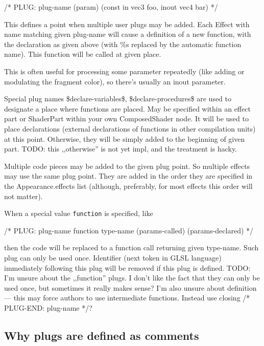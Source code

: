 \documentclass{acmsiggraph}                     %
\newenvironment{mycode}
{\begin{mycodecore}}
{\end{mycodecore}
\vspace{-0.1in}}
\begin{document}
\begin{mycode}
/* PLUG: plug-name (param) (const in vec3 foo, inout vec4 bar) */
\end{mycode}

This defines a point when multiple user plugs may be added. Each
Effect with name matching given plug-name will cause a
definition of a new function, with the declaration as given above
(with \%s replaced by the automatic function name). This function will
be called at given place.

This is often useful for processing some parameter
repeatedly (like adding or modulating the fragment color),
so there's usually an inout parameter.

Special plug names \$declare-variables\$, \$declare-procedures\$
are used to designate a place where functions are placed.
May be specified within an effect part or ShaderPart within
your own ComposedShader node. It will be used to place
declarations (external declarations of functions in other compilation
units) at this point. Otherwise, they will be simply added to
the beginning of given part. TODO: this ,,otherwise'' is not yet impl,
and the treatment is hacky.

Multiple code pieces may be added to the given plug point.
So multiple effects may use the same plug point. They are added
in the order they are specified in the Appearance.effects list
(although, preferably, for most effects this order will not matter).

When a special value \texttt{function} is specified, like

\begin{mycode}
/* PLUG: plug-name function type-name (params-called) (params-declared) */
\end{mycode}

then the code will be replaced to a function call returning given type-name.
Such plug can only be used once.
Identifier (next token in GLSL language) immediately following
this plug will be removed if this plug is defined.
TODO: I'm unsure about the ,,function'' plugs.
I don't like the fact that they can only be used once, but sometimes
it really makes sense?
I'm also unsure about definition --- this may force authors to use
intermediate functions. Instead use closing /* PLUG-END: plug-name */?

\subsection{Why plugs are defined as comments}
\end{document}
